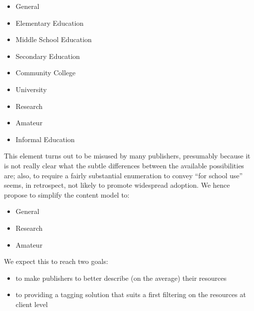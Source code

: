 \documentclass{ivoa}
\begin{document}
\begin{itemize}

\item General{}

\item Elementary Education{}

\item Middle School Education{}

\item Secondary Education{}

\item Community College{}

\item University{}

\item Research{}

\item Amateur{}

\item Informal Education{}

\end{itemize}

This element turns out to be misused by many publishers, presumably because
it is not really clear what the subtle differences between the available
possibilities are; also, to require a fairly substantial enumeration to
convey ``for school use'' seems, in retrospect, not likely to promote
widespread adoption. We hence propose to simplify the content model
to:


\begin{itemize}

\item General{}

\item Research{}

\item Amateur{}

\end{itemize}

We expect this to reach two goals:
  
\begin{itemize}

\item to make publishers to better describe (on the average)
    their resources{}

\item to providing a tagging solution that suits a first filtering 
    on the resources at client level{}

\end{itemize}
\end{document}
